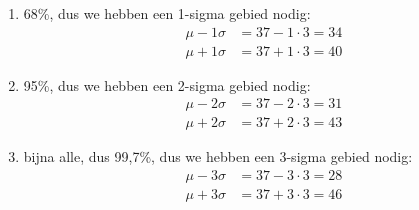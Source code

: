\begin{antwoord}{1}
\begin{enumerate}
 \item 68\%, dus we hebben een 1-sigma gebied nodig:
 \begin{align*}
  \mu - 1\sigma &= 37 - 1 \cdot 3 = 34 \\
  \mu + 1\sigma &= 37 + 1 \cdot 3 = 40 
 \end{align*}
 \item 95\%, dus we hebben een 2-sigma gebied nodig:
 \begin{align*}
  \mu - 2\sigma &= 37 - 2 \cdot 3 = 31 \\
  \mu + 2\sigma &= 37 + 2 \cdot 3 = 43 
 \end{align*}
 \item bijna alle, dus 99,7\%, dus we hebben een 3-sigma gebied nodig:
 \begin{align*}
  \mu - 3\sigma &= 37 - 3 \cdot 3 = 28 \\
  \mu + 3\sigma &= 37 + 3 \cdot 3 = 46 
 \end{align*}
 \end{enumerate} 
\end{antwoord}
